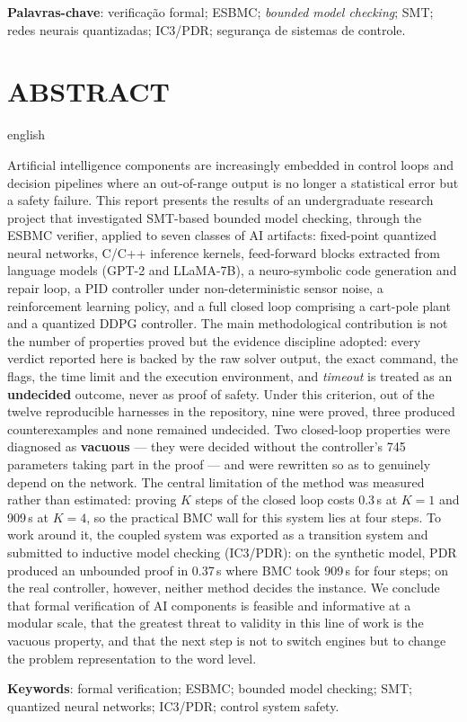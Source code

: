 \vspace{0.4cm}
\noindent\textbf{Palavras-chave}: verificação formal; ESBMC; \textit{bounded model
checking}; SMT; redes neurais quantizadas; IC3/PDR; segurança de sistemas de controle.

\clearpage
{}
{}
\section*{ABSTRACT}
\begin{otherlanguage*}{english}

Artificial intelligence components are increasingly embedded in control loops and
decision pipelines where an out-of-range output is no longer a statistical error but a
safety failure. This report presents the results of an undergraduate research project
that investigated SMT-based bounded model checking, through the ESBMC verifier, applied
to seven classes of AI artifacts: fixed-point quantized neural networks, C/C++ inference
kernels, feed-forward blocks extracted from language models (GPT-2 and LLaMA-7B), a
neuro-symbolic code generation and repair loop, a PID controller under non-deterministic
sensor noise, a reinforcement learning policy, and a full closed loop comprising a
cart-pole plant and a quantized DDPG controller. The main methodological contribution is
not the number of properties proved but the evidence discipline adopted: every verdict
reported here is backed by the raw solver output, the exact command, the flags, the time
limit and the execution environment, and \textit{timeout} is treated as an
\textbf{undecided} outcome, never as proof of safety. Under this criterion, out of the
twelve reproducible harnesses in the repository, nine were proved, three produced
counterexamples and none remained undecided. Two closed-loop properties were diagnosed
as \textbf{vacuous} --- they were decided without the controller's 745 parameters taking
part in the proof --- and were rewritten so as to genuinely depend on the network. The
central limitation of the method was measured rather than estimated: proving $K$ steps of
the closed loop costs 0.3\,s at $K{=}1$ and 909\,s at $K{=}4$, so the practical BMC wall
for this system lies at four steps. To work around it, the coupled system was exported as
a transition system and submitted to inductive model checking (IC3/PDR): on the synthetic
model, PDR produced an unbounded proof in 0.37\,s where BMC took 909\,s for four steps;
on the real controller, however, neither method decides the instance. We conclude that
formal verification of AI components is feasible and informative at a modular scale, that
the greatest threat to validity in this line of work is the vacuous property, and that
the next step is not to switch engines but to change the problem representation to the
word level.

\vspace{0.4cm}
\noindent\textbf{Keywords}: formal verification; ESBMC; bounded model checking; SMT;
quantized neural networks; IC3/PDR; control system safety.

\end{otherlanguage*}
